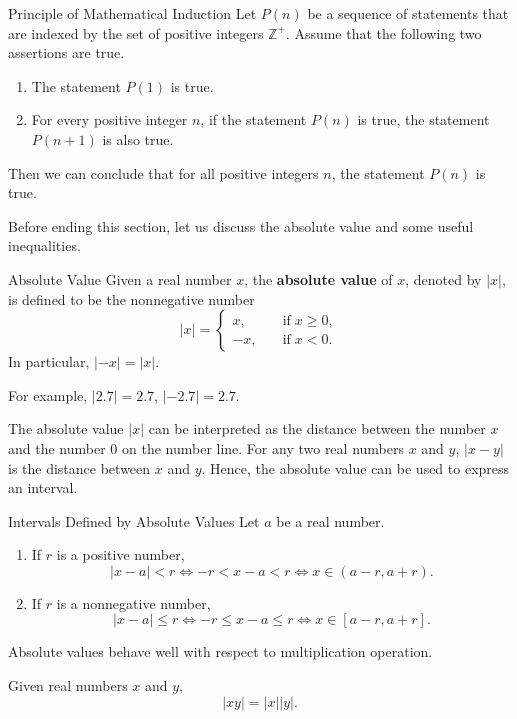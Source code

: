 \begin{proposition}{Principle of Mathematical Induction}
Let $P(n)$ be a sequence of statements that are indexed by the set of positive integers $\mathbb{Z}^+$. Assume that the following two assertions are true.
\begin{enumerate}[1.]
\item The statement $P(1)$ is true.
\item For every positive integer $n$, if the statement $P(n)$ is true, the statement $P(n+1)$ is also true.
\end{enumerate}Then we can conclude that for all positive integers $n$, the statement $P(n)$ is true.

\end{proposition}


Before ending this section, let us discuss the absolute value and some useful inequalities.
\begin{definition}{Absolute Value}
Given a real number $x$, the {\bf absolute value} of $x$, denoted by $|x|$, is defined to be the nonnegative number
\[|x|=\begin{cases}x,\quad &\text{if}\;x\geq 0,\\-x,\quad &\text{if}\;x<0.\end{cases}\]
In particular, $|-x|=|x|$.
\end{definition}

For example, $|2.7|=2.7$, $|-2.7|=2.7$. 

The absolute value  $|x|$ can be interpreted as the distance between the number $x$ and the number $0$ on the number line. For any two real numbers $x$ and $y$, $|x-y|$ is the distance between $x$ and $y$. Hence, the  absolute value can be used to express an interval.
\begin{highlight}{Intervals Defined by Absolute Values}
Let $a$ be a real number.
\begin{enumerate}[1.]
\item
If $r$ is a positive number, 
\[|x-a|<r\iff -r<x-a<r \iff x\in (a-r, a+r).\]
\item 
If $r$ is a nonnegative number, 
\[|x-a|\leq r\iff  -r\leq x-a\leq r \iff x\in [a-r, a+r].\]
\end{enumerate}
\end{highlight}

Absolute values behave well with respect to multiplication operation. 
\begin{proposition}{}
Given real numbers $x$ and $y$,
\[|xy|=|x||y|.\]
\end{proposition}


